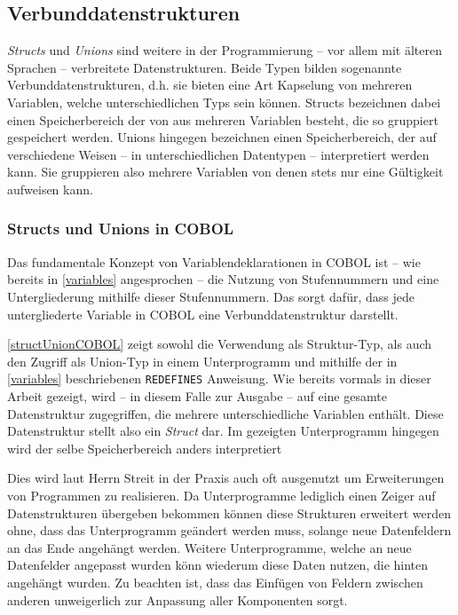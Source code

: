 \subsection{Verbunddatenstrukturen}
\textit{Structs} und \textit{Unions} sind weitere in der Programmierung -- vor allem mit älteren Sprachen -- verbreitete Datenstrukturen. Beide Typen bilden sogenannte Verbunddatenstrukturen, d.h. sie bieten eine Art Kapselung von mehreren Variablen, welche unterschiedlichen Typs sein können. Structs bezeichnen dabei einen Speicherbereich der von aus mehreren Variablen besteht, die so gruppiert gespeichert werden. Unions hingegen bezeichnen einen Speicherbereich, der auf verschiedene Weisen -- in unterschiedlichen Datentypen -- interpretiert werden kann. Sie gruppieren also mehrere Variablen von denen stets nur eine Gültigkeit aufweisen kann.

\subsubsection*{Structs und Unions in COBOL}

Das fundamentale Konzept von Variablendeklarationen in COBOL ist -- wie bereits in \autoref{variables} angesprochen -- die Nutzung von Stufennummern und eine Untergliederung mithilfe dieser Stufennummern. Das sorgt dafür, dass jede untergliederte Variable in COBOL eine Verbunddatenstruktur darstellt.


\autoref{structUnionCOBOL} zeigt sowohl die Verwendung als Struktur-Typ, als auch den Zugriff als Union-Typ in einem Unterprogramm und mithilfe der in \autoref{variables} beschriebenen \texttt{REDEFINES} Anweisung. Wie bereits vormals in dieser Arbeit gezeigt, wird -- in diesem Falle zur Ausgabe -- auf eine gesamte Datenstruktur zugegriffen, die mehrere unterschiedliche Variablen enthält. Diese Datenstruktur stellt also ein \textit{Struct} dar. Im gezeigten Unterprogramm hingegen wird der selbe Speicherbereich anders interpretiert

Dies wird laut Herrn Streit in der Praxis auch oft ausgenutzt um Erweiterungen von Programmen zu realisieren. Da Unterprogramme lediglich einen Zeiger auf Datenstrukturen übergeben bekommen können diese Strukturen erweitert werden ohne, dass das Unterprogramm geändert werden muss, solange neue Datenfeldern an das Ende angehängt werden. Weitere Unterprogramme, welche an neue Datenfelder angepasst wurden könn wiederum diese Daten nutzen, die hinten angehängt wurden. Zu beachten ist, dass das Einfügen von Feldern zwischen anderen unweigerlich zur Anpassung aller Komponenten sorgt.

